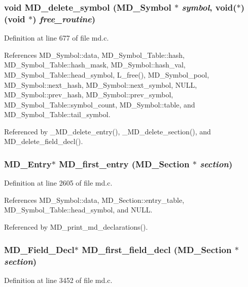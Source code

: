 \subsubsection{\setlength{\rightskip}{0pt plus 5cm}void MD\_\-delete\_\-symbol (\bf{MD\_\-Symbol} $\ast$ {\em symbol}, void($\ast$)(void $\ast$) {\em free\_\-routine})}\label{md_8h_90ee89ec501eb28072b0766dec0dd5fc}




Definition at line 677 of file md.c.

References MD\_\-Symbol::data, MD\_\-Symbol\_\-Table::hash, MD\_\-Symbol\_\-Table::hash\_\-mask, MD\_\-Symbol::hash\_\-val, MD\_\-Symbol\_\-Table::head\_\-symbol, L\_\-free(), MD\_\-Symbol\_\-pool, MD\_\-Symbol::next\_\-hash, MD\_\-Symbol::next\_\-symbol, NULL, MD\_\-Symbol::prev\_\-hash, MD\_\-Symbol::prev\_\-symbol, MD\_\-Symbol\_\-Table::symbol\_\-count, MD\_\-Symbol::table, and MD\_\-Symbol\_\-Table::tail\_\-symbol.

Referenced by \_\-MD\_\-delete\_\-entry(), \_\-MD\_\-delete\_\-section(), and MD\_\-delete\_\-field\_\-decl().
\subsubsection{\setlength{\rightskip}{0pt plus 5cm}\bf{MD\_\-Entry}$\ast$ MD\_\-first\_\-entry (\bf{MD\_\-Section} $\ast$ {\em section})}\label{md_8h_665a6d3a42e627dd69abb473cdc4aade}




Definition at line 2605 of file md.c.

References MD\_\-Symbol::data, MD\_\-Section::entry\_\-table, MD\_\-Symbol\_\-Table::head\_\-symbol, and NULL.

Referenced by MD\_\-print\_\-md\_\-declarations().
\subsubsection{\setlength{\rightskip}{0pt plus 5cm}\bf{MD\_\-Field\_\-Decl}$\ast$ MD\_\-first\_\-field\_\-decl (\bf{MD\_\-Section} $\ast$ {\em section})}\label{md_8h_ec8db6e1a71d3ca153e81e270872e8a4}




Definition at line 3452 of file md.c.

